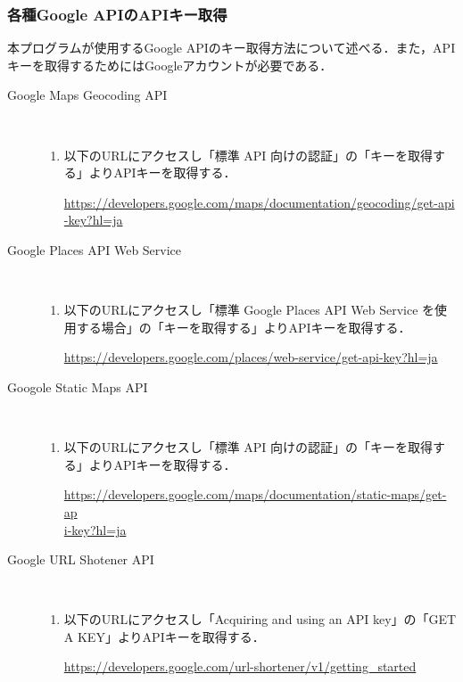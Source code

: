 \documentclass[fleqn, 14pt]{extarticlej}
\begin{document}
\subsubsection{各種Google APIのAPIキー取得}
本プログラムが使用するGoogle APIのキー取得方法について述べる．また，APIキーを取得するためにはGoogleアカウントが必要である．

\begin{description}
\item[Google Maps Geocoding API]\
  \begin{enumerate}
  \item 以下のURLにアクセスし「標準 API 向けの認証」の「キーを取得する」よりAPIキーを取得する．

    \url{https://developers.google.com/maps/documentation/geocoding/get-api}\\
    \url{-key?hl=ja}
  \end{enumerate}

\item[Google Places API Web Service]\
  \begin{enumerate}
  \item 以下のURLにアクセスし「標準 Google Places API Web Service を使用する場合」の「キーを取得する」よりAPIキーを取得する．
    
    \url{https://developers.google.com/places/web-service/get-api-key?hl=ja}
  \end{enumerate}
  
\item[Googole Static Maps API]\
  \begin{enumerate}
  \item 以下のURLにアクセスし「標準 API 向けの認証」の「キーを取得する」よりAPIキーを取得する．
    
    \url{https://developers.google.com/maps/documentation/static-maps/get-ap}\\
    \url{i-key?hl=ja}
  \end{enumerate}
  
\item[Google URL Shotener API]\
  \begin{enumerate}
  \item 以下のURLにアクセスし「Acquiring and using an API key」の「GET A KEY」よりAPIキーを取得する．
    
    \url{https://developers.google.com/url-shortener/v1/getting_started}
  \end{enumerate}
\end{description}
\end{document}
